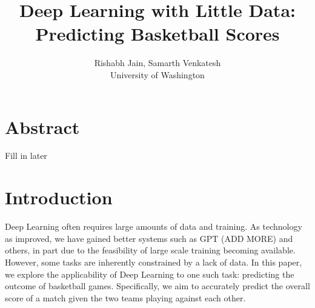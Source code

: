 \documentclass[10pt,twocolumn,letterpaper]{article}
\begin{document}
\title{Deep Learning with Little Data: Predicting Basketball Scores}

\author{Rishabh Jain, Samarth Venkatesh \\
University of Washington \\
}
\maketitle



\section{Abstract}

Fill in later

\section{Introduction}
\label{sec:intro}

Deep Learning often requires large amounts of data and training. As technology as improved,
we have gained better systems such as GPT (ADD MORE) and others, in part due to the
feasibility of large scale training becoming available. However, some tasks are inherently
constrained by a lack of data. In this paper, we explore the applicability of Deep Learning
to one such task: predicting the outcome of basketball games. Specifically, we aim to
accurately predict the overall score of a match given the two teams playing against each other.
\end{document}
